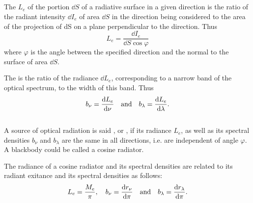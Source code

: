 \subsection{}\label{36.4.3} The  $L_{e}$ of the portion $\dd S$ of a radiative surface in a given direction is the ratio of the radiant intensity $\dd I_{e}$
of area $\dd S$ in the direction being considered to the area of the projection of dS on a plane perpendicular to the direction. Thus
\begin{equation*}%
L_{e} = \frac{\dd I_{e}}{\dd S \cos \varphi}
\end{equation*}
where $\varphi$ is the angle between the specified direction and the normal to the surface of area $\dd S$.

The  is the ratio of the radiance $\dd L_{e}$, corresponding to a narrow band of the optical spectrum, to the width of this band. Thus
\begin{equation*}%
b_{\nu} = \dv{L_{e}}{\nu} \qand b_{\lambda} = \dv{L_{e}}{\lambda}.
\end{equation*}

\subsection{}\label{36.4.4} A source of optical radiation is said , or , if its radiance $L_{e}$, as well as its spectral densities $b_{\nu}$ and $b_{\lambda}$ are the same in all directions, i.e. are independent of angle $\varphi$. A blackbody could be called a cosine radiator.

The radiance of a cosine radiator and its spectral densities are related to its radiant exitance and its spectral densities  as follows:
\begin{equation*}%
L_{e} = \frac{M_{e}}{\pi}, \quad b_{\nu} = \dv{r_{\nu}}{\pi} \qand b_{\lambda} = \dv{r_{\lambda}}{\pi}.
\end{equation*}


